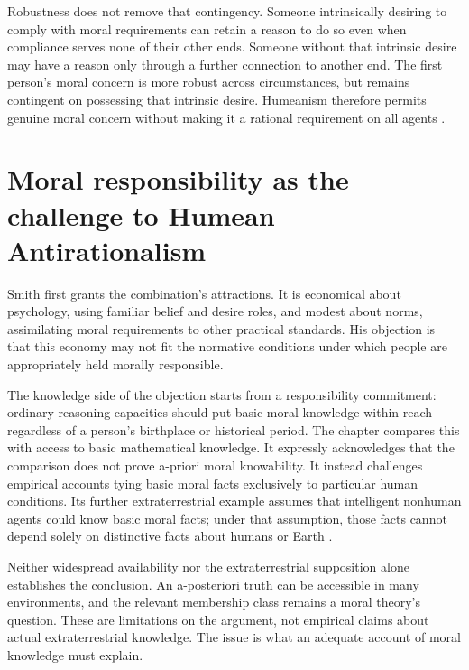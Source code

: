 Robustness does not remove that contingency. Someone intrinsically
desiring to comply with moral requirements can retain a reason to do so
even when compliance serves none of their other ends. Someone without
that intrinsic desire may have a reason only through a further connection
to another end. The first person's moral concern is more robust across
circumstances, but remains contingent on possessing that intrinsic desire.
Humeanism therefore permits genuine moral concern without making it a
rational requirement on all agents
\parencite[p.~696]{Smith2021MoralReasons}.

\section{Moral responsibility as the challenge to Humean Antirationalism}
\label{sec:p11-r122-responsibility}

Smith first grants the combination's attractions. It is economical about
psychology, using familiar belief and desire roles, and modest about norms,
assimilating moral requirements to other practical standards. His objection
is that this economy may not fit the normative conditions under which
people are appropriately held morally responsible.

The knowledge side of the objection starts from a responsibility
commitment: ordinary reasoning capacities should put basic moral
knowledge within reach regardless of a person's birthplace or historical
period. The chapter compares this with access to basic mathematical
knowledge. It expressly acknowledges that the comparison does not prove
a-priori moral knowability. It instead challenges empirical accounts tying
basic moral facts exclusively to particular human conditions. Its further
extraterrestrial example assumes that intelligent nonhuman agents could
know basic moral facts; under that assumption, those facts cannot depend
solely on distinctive facts about humans or Earth
\parencite[p.~696]{Smith2021MoralReasons}.

Neither widespread availability nor the extraterrestrial supposition alone
establishes the conclusion. An a-posteriori truth can be accessible in
many environments, and the relevant membership class remains a moral
theory's question. These are limitations on the argument, not empirical
claims about actual extraterrestrial knowledge. The issue is what an
adequate account of moral knowledge must explain.


